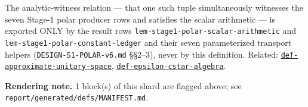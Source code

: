 \begin{defnote}
The analytic-witness relation --- that one such tuple simultaneously witnesses
the seven Stage-1 polar producer rows and satisfies the scalar arithmetic ---
is exported ONLY by the result rows
\texttt{lem-\allowbreak{}stage1-\allowbreak{}polar-\allowbreak{}scalar-\allowbreak{}arithmetic} and \texttt{lem-\allowbreak{}stage1-\allowbreak{}polar-\allowbreak{}constant-\allowbreak{}ledger}
and their seven parameterized transport helpers
(\texttt{DESIGN-\allowbreak{}S1-\allowbreak{}POLAR-\allowbreak{}v6.\allowbreak{}md} \S{}\S{}2--3), never by this definition. Related:
\hyperref[def:approximate-unitary-space]{\texttt{def-\allowbreak{}approximate-\allowbreak{}unitary-\allowbreak{}space}}, \hyperref[def:epsilon-cstar-algebra]{\texttt{def-\allowbreak{}epsilon-\allowbreak{}cstar-\allowbreak{}algebra}}.
\par
\textbf{Rendering note.} 1 block(s) of this shard are flagged above; see \texttt{report/generated/defs/MANIFEST.md}.
\end{defnote}

